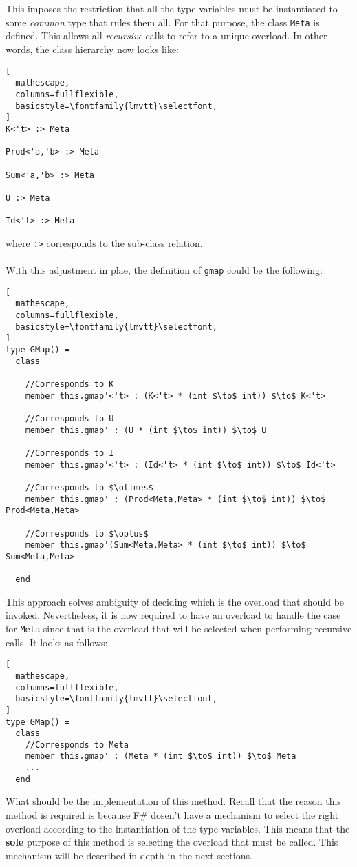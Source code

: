 \documentclass[8pt]{extarticle}
\begin{document}
\\\\This imposes the restriction that all the type variables must be instantiated to some {\it common} type that rules them all. For that purpose, the class \verb+Meta+ is defined. This allows all {\it recursive} calls to refer to a unique overload. In other words, the class hierarchy now looks like:
\begin{lstlisting}[
  mathescape,
  columns=fullflexible,
  basicstyle=\fontfamily{lmvtt}\selectfont,
]
K<'t> :> Meta

Prod<'a,'b> :> Meta

Sum<'a,'b> :> Meta

U :> Meta

Id<'t> :> Meta
\end{lstlisting}
where \verb+:>+ corresponds to the sub-class relation.
\\\\With this adjustment in plae, the definition of \verb+gmap+ could be the following:
\begin{lstlisting}[
  mathescape,
  columns=fullflexible,
  basicstyle=\fontfamily{lmvtt}\selectfont,
]
type GMap() =
  class

    //Corresponds to K
    member this.gmap'<'t> : (K<'t> * (int $\to$ int)) $\to$ K<'t>

    //Corresponds to U
    member this.gmap' : (U * (int $\to$ int)) $\to$ U

    //Corresponds to I
    member this.gmap'<'t> : (Id<'t> * (int $\to$ int)) $\to$ Id<'t>
    
    //Corresponds to $\otimes$
    member this.gmap' : (Prod<Meta,Meta> * (int $\to$ int)) $\to$ Prod<Meta,Meta>

    //Corresponds to $\oplus$
    member this.gmap'(Sum<Meta,Meta> * (int $\to$ int)) $\to$ Sum<Meta,Meta>

  end
\end{lstlisting}
This approach solves ambiguity of deciding which is the overload that should be invoked. Nevertheless, it is now required to have an overload to handle the case for \verb+Meta+ since that is the overload that will be selected when performing recursive calls. It looks as follows:
\begin{lstlisting}[
  mathescape,
  columns=fullflexible,
  basicstyle=\fontfamily{lmvtt}\selectfont,
]
type GMap() =
  class
    //Corresponds to Meta
    member this.gmap' : (Meta * (int $\to$ int)) $\to$ Meta
    ...
  end
\end{lstlisting}
What should be the implementation of this method. Recall that the reason this method is required is because F\# dosen't have a mechanism to select the right overload according to the instantiation of the type variables. This means that the {\bf sole} purpose of this method is selecting the overload that must be called. This mechanism will be described in-depth in the next sections.
\end{document}
